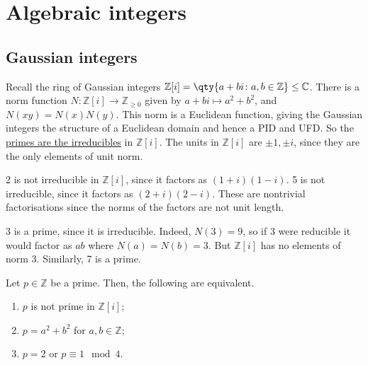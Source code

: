 \section{Algebraic integers}

\subsection{Gaussian integers}
Recall the ring of Gaussian integers $\mathbb Z[i] = \qty{a+bi \colon a, b \in \mathbb Z} \leq \mathbb C$.
There is a norm function $N \colon \mathbb Z[i] \to \mathbb Z_{\geq 0}$ given by $a + bi \mapsto a^2 + b^2$, and $N(xy) = N(x) N(y)$.
This norm is a Euclidean function, giving the Gaussian integers the structure of a Euclidean domain and hence a PID and UFD.
So the \underline{primes are the irreducibles} in $\mathbb{Z}[i]$.
The units in $\mathbb Z[i]$ are $\pm 1, \pm i$, since they are the only elements of unit norm.

\begin{example}
	2 is not irreducible in $\mathbb Z[i]$, since it factors as $(1+i)(1-i)$.
	5 is not irreducible, since it factors as $(2+i)(2-i)$.
	These are nontrivial factorisations since the norms of the factors are not unit length.

	3 is a prime, since it is irreducible.
	Indeed, $N(3) = 9$, so if 3 were reducible it would factor as $ab$ where $N(a) = N(b) = 3$.
	But $\mathbb Z[i]$ has no elements of norm 3.
	Similarly, 7 is a prime.
\end{example}

\begin{proposition} \label{prp:12.1}
	Let $p \in \mathbb Z$ be a prime.
	Then, the following are equivalent.
	\begin{enumerate}
		\item $p$ is not prime in $\mathbb Z[i]$;
		\item $p = a^2 + b^2$ for $a, b \in \mathbb Z$;
		\item $p = 2$ or $p \equiv 1 \mod 4$.
	\end{enumerate}
\end{proposition}

